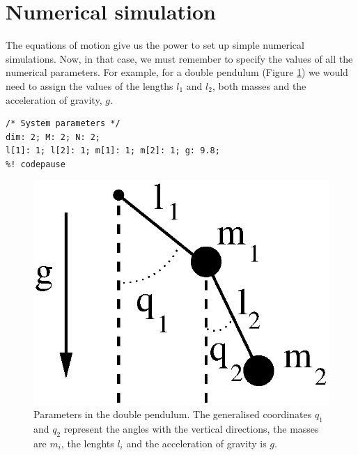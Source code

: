 \documentclass{article}
\begin{document}

\section{Numerical simulation}

The equations of motion give us the power to set up simple numerical
simulations. Now, in that case, we must remember to specify the values of all
the numerical parameters. For example, for a double pendulum (Figure
\ref{double_pendulum}) we would need to assign the values of the lengths $l_1$
and $l_2$, both masses and the acceleration of gravity, $g$.
\begin{lstlisting}[frame=single]
%! codefile: double_pendulum.mc
/* System parameters */
dim: 2; M: 2; N: 2;
l[1]: 1; l[2]: 1; m[1]: 1; m[2]: 1; g: 9.8;
%! codepause
\end{lstlisting}

\begin{figure}
  \centering
  \includegraphics[width = 0.5 \textwidth]{double_pendulum.eps}
  \caption{\label{double_pendulum}Parameters in the double pendulum. The 
                  generalised coordinates $q_1$ and $q_2$ represent the
                  angles with the vertical directions, the masses are $m_i$, 
                  the lenghts $l_i$ and the acceleration of gravity is $g$.}
\end{figure}
\end{document}
